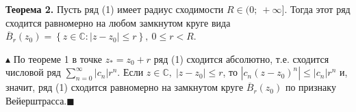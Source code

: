 \documentclass[a4paper, 16pt]{article}
\begin{document}
\textbf{Теорема 2.} Пусть ряд (1) имеет радиус сходимости $R \in (0;\:+\infty]$. Тогда этот ряд сходится равномерно на любом замкнутом круге вида $\overline{B}_{r}(z_0)=\left\{z \in \mathbb{C}:|z-z_0|\leqslant r\right\},\:0 \leqslant r < R$.

$\blacktriangle$ По теореме 1 в точке $z_*=z_0+r$ ряд (1) сходится абсолютно, т.е. сходится числовой ряд $\sum\limits_{n=0}^{\infty}|c_n|r^n$. Если $z \in \mathbb{C}, \;|z-z_0| \leqslant r$, то $|c_n(z-z_0)^n|\leqslant|c_n|r^n$ и, значит, ряд (1) сходится равномерно на замкнутом круге $\overline{B}_r(z_0)$ по признаку Вейерштрасса.\:$\blacksquare$
\end{document}
